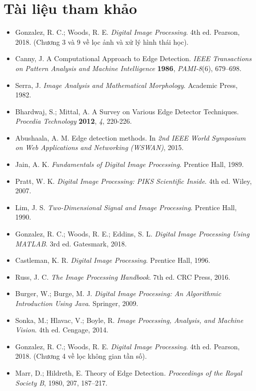 \section*{Tài liệu tham khảo}
\begin{itemize}
	\item Gonzalez, R. C.; Woods, R. E. \textit{Digital Image Processing}. 4th ed. Pearson, 2018. (Chương 3 và 9 về lọc ảnh và xử lý hình thái học).
	\item Canny, J. A Computational Approach to Edge Detection. \textit{IEEE Transactions on Pattern Analysis and Machine Intelligence} \textbf{1986}, \textit{PAMI-8}(6), 679–698.
	\item Serra, J. \textit{Image Analysis and Mathematical Morphology}. Academic Press, 1982.
	\item Bhardwaj, S.; Mittal, A. A Survey on Various Edge Detector Techniques. \textit{Procedia Technology} \textbf{2012}, \textit{4}, 220-226.
	\item Abushaala, A. M. Edge detection methods. In \textit{2nd IEEE World Symposium on Web Applications and Networking (WSWAN)}, 2015.
	\item Jain, A. K. \textit{Fundamentals of Digital Image Processing}. Prentice Hall, 1989.
	\item Pratt, W. K. \textit{Digital Image Processing: PIKS Scientific Inside}. 4th ed. Wiley, 2007.
	\item Lim, J. S. \textit{Two-Dimensional Signal and Image Processing}. Prentice Hall, 1990.
	\item Gonzalez, R. C.; Woods, R. E.; Eddins, S. L. \textit{Digital Image Processing Using MATLAB}. 3rd ed. Gatesmark, 2018.
	\item Castleman, K. R. \textit{Digital Image Processing}. Prentice Hall, 1996.
	\item Russ, J. C. \textit{The Image Processing Handbook}. 7th ed. CRC Press, 2016.
	\item Burger, W.; Burge, M. J. \textit{Digital Image Processing: An Algorithmic Introduction Using Java}. Springer, 2009.
	\item Sonka, M.; Hlavac, V.; Boyle, R. \textit{Image Processing, Analysis, and Machine Vision}. 4th ed. Cengage, 2014.
	\item Gonzalez, R. C.; Woods, R. E. \textit{Digital Image Processing}. 4th ed. Pearson, 2018. (Chương 4 về lọc không gian tần số).
	\item Marr, D.; Hildreth, E. Theory of Edge Detection. \textit{Proceedings of the Royal Society B}, 1980, 207, 187–217.

\end{itemize}
